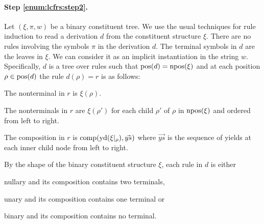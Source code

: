 \documentclass[../../document.tex]{subfiles}
\begin{document}
    \paragraph{Step \ref{enum:lcfrs:step2}.}
    Let \((\xi, \pi, w)\) be a binary constituent tree.
    We use the usual techniques for  rule induction to read a derivation \(d\) from the constituent structure \(\xi\).
    There are no rules involving the  symbols \(\pi\) in the derivation \(d\).
    The terminal symbols in \(d\) are the leaves in \(\xi\). We can consider it as an implicit instantiation in the string \(w\).
    Specifically, \(d\) is a tree over  rules such that \(\operatorname{pos}(d) = \operatorname{npos}(\xi)\) and at each position \(\rho \in \operatorname{pos}(d)\) the rule \(d(\rho) = r\) is as follows:
    \begin{compactitem}
        \item The  nonterminal in \(r\) is \(\xi(\rho)\).
        \item The  nonterminals in \(r\) are \(\xi(\rho')\) for each child \(\rho'\) of \(\rho\) in \(\operatorname{npos}(\xi)\) and ordered from left to right.
        \item The composition in \(r\) is \(\mathrm{comp}(\operatorname{yd}(\xi|_\rho), \vec{ys})\) where \(\vec{ys}\) is the sequence of yields at each inner child node from left to right.
    \end{compactitem}
    By the shape of the binary constituent structure \(\xi\), each rule in \(d\) is either
    \begin{inparaitem}[]
        \item nullary and its composition contains two terminals,
        \item unary and its composition contains one terminal or
        \item binary and its composition contains no terminal.
    \end{inparaitem}
\end{document}
